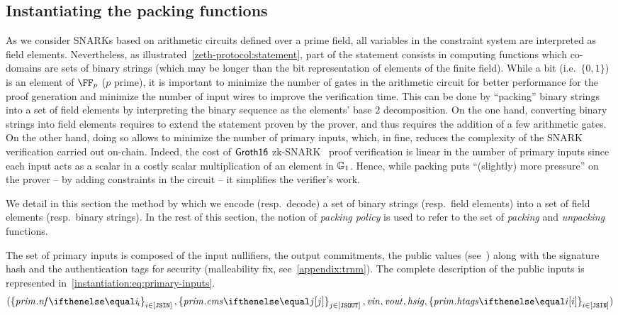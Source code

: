 \subsection{Instantiating the packing functions}\label{instantiation:statement:pack}

As we consider SNARKs based on arithmetic circuits defined over a prime field, all variables in the constraint system are interpreted as field elements. Nevertheless, as illustrated~\cref{zeth-protocol:statement}, part of the statement consists in computing functions which co-domains are sets of binary strings (which may be longer than the bit representation of elements of the finite field). While a bit (i.e.~$\{0, 1\}$) is an element of $\FF_p$ ($p$ prime), it is important to minimize the number of gates in the arithmetic circuit for better performance for the proof generation and minimize the number of input wires to improve the verification time. This can be done by ``packing'' binary strings into a set of field elements by interpreting the binary sequence as the elements' base 2 decomposition. On the one hand, converting binary strings into field elements requires to extend the statement proven by the prover, and thus requires the addition of a few arithmetic gates. On the other hand, doing so allows to minimize the number of primary inputs, which, in fine, reduces the complexity of the SNARK verification carried out on-chain.
Indeed, the cost of $\mathsf{Groth16}$ zk-SNARK~\cite{groth2016size} proof verification is linear in the number of primary inputs since each input acts as a scalar in a costly scalar multiplication of an element in $\mathbb{G}_1$. Hence, while packing puts ``(slightly) more pressure'' on the prover -- by adding constraints in the circuit -- it simplifies the verifier's work.

We detail in this section the method by which we encode (resp.~decode) a set of binary strings (resp.~field elements) into a set of field elements (resp.~binary strings). In the rest of this section, the notion of \emph{packing policy} is used to refer to the set of \emph{packing} and \emph{unpacking} functions.

The set of primary inputs is composed of the input nullifiers, the output commitments, the public values (see~\cite[Section 3.4.3]{zethpaper}) along with the signature hash and the authentication tags for security (malleability fix, see~\cref{appendix:trnm}). The complete description of the public inputs is represented in~\cref{instantiation:eq:primary-inputs}.
%
\begin{equation}\label{instantiation:eq:primary-inputs}
    (\indexedset{\priminputs.\nf{i}}{i \in [\jsin]}, \indexedset{\priminputs.\cms{j}}{j \in [\jsout]}, \vin, \vout, \hsig, \indexedset{\priminputs.\htags{i}}{i \in [\jsin]})
\end{equation}

